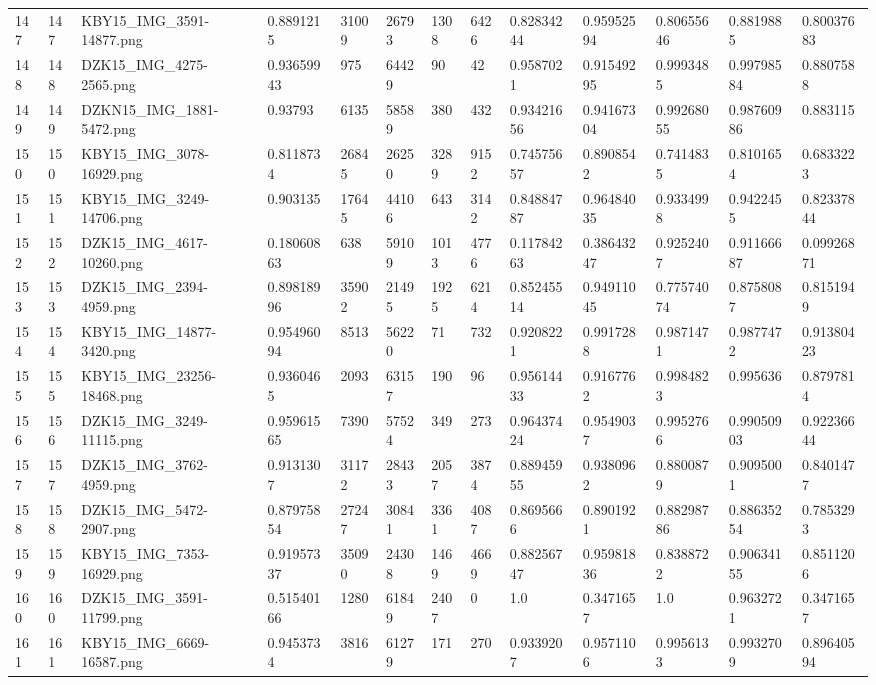 \documentclass[11pt, a4paper, twoside]{report}
\begin{document}
\begin{longtable}[c]{@{}lllllllllllll@{}}
147 & 147 & KBY15\_IMG\_3591-14877.png & 0.8891215 & 31009 & 26793 & 1308 & 6426 & 0.82834244 & 0.95952594 & 0.80655646 & 0.8819885 & 0.80037683 \\
148 & 148 & DZK15\_IMG\_4275-2565.png & 0.93659943 & 975 & 64429 & 90 & 42 & 0.9587021 & 0.91549295 & 0.9993485 & 0.99798584 & 0.8807588 \\
149 & 149 & DZKN15\_IMG\_1881-5472.png & 0.93793 & 6135 & 58589 & 380 & 432 & 0.93421656 & 0.94167304 & 0.99268055 & 0.98760986 & 0.883115 \\
150 & 150 & KBY15\_IMG\_3078-16929.png & 0.8118734 & 26845 & 26250 & 3289 & 9152 & 0.74575657 & 0.8908542 & 0.7414835 & 0.8101654 & 0.6833223 \\
151 & 151 & KBY15\_IMG\_3249-14706.png & 0.903135 & 17645 & 44106 & 643 & 3142 & 0.84884787 & 0.96484035 & 0.9334998 & 0.9422455 & 0.82337844 \\
152 & 152 & DZK15\_IMG\_4617-10260.png & 0.18060863 & 638 & 59109 & 1013 & 4776 & 0.11784263 & 0.38643247 & 0.9252407 & 0.91166687 & 0.09926871 \\
153 & 153 & DZK15\_IMG\_2394-4959.png & 0.89818996 & 35902 & 21495 & 1925 & 6214 & 0.85245514 & 0.94911045 & 0.77574074 & 0.8758087 & 0.8151949 \\
154 & 154 & KBY15\_IMG\_14877-3420.png & 0.95496094 & 8513 & 56220 & 71 & 732 & 0.9208221 & 0.9917288 & 0.9871471 & 0.9877472 & 0.91380423 \\
155 & 155 & KBY15\_IMG\_23256-18468.png & 0.9360465 & 2093 & 63157 & 190 & 96 & 0.95614433 & 0.9167762 & 0.9984823 & 0.995636 & 0.8797814 \\
156 & 156 & DZK15\_IMG\_3249-11115.png & 0.95961565 & 7390 & 57524 & 349 & 273 & 0.96437424 & 0.9549037 & 0.9952766 & 0.99050903 & 0.92236644 \\
157 & 157 & DZK15\_IMG\_3762-4959.png & 0.9131307 & 31172 & 28433 & 2057 & 3874 & 0.88945955 & 0.9380962 & 0.8800879 & 0.9095001 & 0.8401477 \\
158 & 158 & DZK15\_IMG\_5472-2907.png & 0.87975854 & 27247 & 30841 & 3361 & 4087 & 0.8695666 & 0.8901921 & 0.88298786 & 0.88635254 & 0.7853293 \\
159 & 159 & KBY15\_IMG\_7353-16929.png & 0.91957337 & 35090 & 24308 & 1469 & 4669 & 0.88256747 & 0.95981836 & 0.8388722 & 0.90634155 & 0.8511206 \\
160 & 160 & DZK15\_IMG\_3591-11799.png & 0.51540166 & 1280 & 61849 & 2407 & 0 & 1.0 & 0.3471657 & 1.0 & 0.9632721 & 0.3471657 \\
161 & 161 & KBY15\_IMG\_6669-16587.png & 0.9453734 & 3816 & 61279 & 171 & 270 & 0.9339207 & 0.9571106 & 0.9956133 & 0.9932709 & 0.89640594 \\

\end{longtable}
\end{document}
